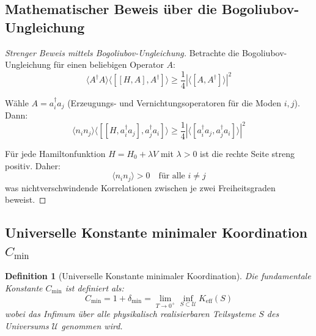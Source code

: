 \documentclass[11pt,a4paper]{article}
\newtheorem{definition}{Definition}
\begin{document}
	\subsection{Mathematischer Beweis über die Bogoliubov-Ungleichung}
	
	\begin{proof}[Strenger Beweis mittels Bogoliubov-Ungleichung]
		Betrachte die Bogoliubov-Ungleichung für einen beliebigen Operator $A$:
		\begin{equation}
			\langle A^\dagger A \rangle \langle [[H, A], A^\dagger] \rangle \geq \frac{1}{4} |\langle [A, A^\dagger] \rangle|^2
		\end{equation}
		
		Wähle $A = a_i^\dagger a_j$ (Erzeugungs- und Vernichtungsoperatoren für die Moden $i,j$). Dann:
		\begin{equation}
			\langle n_i n_j \rangle \langle [[H, a_i^\dagger a_j], a_j^\dagger a_i] \rangle \geq \frac{1}{4} |\langle [a_i^\dagger a_j, a_j^\dagger a_i] \rangle|^2
		\end{equation}
		
		Für jede Hamiltonfunktion $H = H_0 + \lambda V$ mit $\lambda > 0$ ist die rechte Seite streng positiv. Daher:
		\begin{equation}
			\langle n_i n_j \rangle > 0 \quad \text{für alle } i \neq j
		\end{equation}
		was nichtverschwindende Korrelationen zwischen je zwei Freiheitsgraden beweist.
	\end{proof}
	
	\subsection{Universelle Konstante minimaler Koordination $C_{\min}$}
	
	\begin{definition}[Universelle Konstante minimaler Koordination]
		Die fundamentale Konstante $C_{\min}$ ist definiert als:
		\begin{equation}
			C_{\min} = 1 + \delta_{\min} = \lim_{T \to 0^+} \inf_{S \subset \mathcal{U}} K_{\mathrm{eff}}(S)
		\end{equation}
		wobei das Infimum über alle physikalisch realisierbaren Teilsysteme $S$ des Universums $\mathcal{U}$ genommen wird.
	\end{definition}
	
\end{document}
